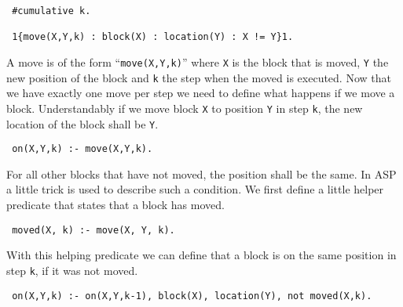 \documentclass[a4paper,10pt]{article}
\begin{document}
\begin{verbatim}
 #cumulative k.

 1{move(X,Y,k) : block(X) : location(Y) : X != Y}1.
\end{verbatim}
A move is of the form ``\texttt{move(X,Y,k)}'' where \texttt{X} is the block that is moved, \texttt{Y} the new position of the block and \texttt{k} the step when the moved is executed.
\newline
Now that we have exactly one move per step we need to define what happens if we move a block.
Understandably if we move block \texttt{X} to position \texttt{Y} in step \texttt{k}, the new location of the block shall be \texttt{Y}.
\begin{verbatim}
 on(X,Y,k) :- move(X,Y,k).
\end{verbatim}
For all other blocks that have not moved, the position shall be the same.
In ASP a little trick is used to describe such a condition.
We first define a little helper predicate that states that a block has moved.
\begin{verbatim}
 moved(X, k) :- move(X, Y, k).
\end{verbatim}
With this helping predicate we can define that a block is on the same position in step \texttt{k}, if it was not moved.
\begin{verbatim}
 on(X,Y,k) :- on(X,Y,k-1), block(X), location(Y), not moved(X,k).
\end{verbatim}
\end{document}
